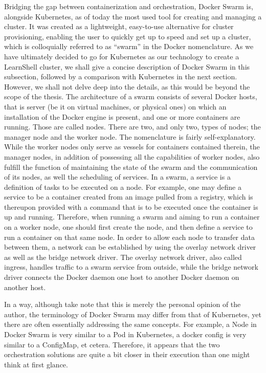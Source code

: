 \documentclass[thesis=B,english]{FITthesis}[2019/12/23]
\begin{document}
Bridging the gap between containerization and orchestration, Docker Swarm is, alongside Kubernetes, as of today the most used tool for creating and managing a cluster. It was created as a lightweight, easy-to-use alternative for cluster provisioning, enabling the user to quickly get up to speed and set up a cluster, which is colloquially referred to as “swarm” in the Docker nomenclature. As we have ultimately decided to go for Kubernetes as our technology to create a LearnShell cluster, we shall give a concise description of Docker Swarm in this subsection, followed by a comparison with Kubernetes in the next section. However, we shall not delve deep into the details, as this would be beyond the scope of the thesis.
\newline
The architecture of a swarm consists of several Docker hosts, that is server (be it on virtual machines, or physical ones) on which an installation of the Docker engine is present, and one or more containers are running. \cite{swarm-key-concepts} Those are called nodes. There are two, and only two, types of nodes; the manager node and the worker node. The nomenclature is fairly self-explanatory. While the worker nodes only serve as vessels for containers contained therein, the manager nodes, in addition of possessing all the capabilities of worker nodes, also fulfill the function of maintaining the state of the swarm and the communication of its nodes, as well the scheduling of services. In a swarm, a service is a definition of tasks to be executed on a node. \cite{swarm-nodes} For example, one may define a service to be a container created from an image pulled from a registry, which is thereupon provided with a command that is to be executed once the container is up and running. Therefore, when running a swarm and aiming to run a container on a worker node, one should first create the node, and then define a service to run a container on that same node.
\newline
In order to allow each node to transfer data between them, a network can be established by using the overlay network driver as well as the bridge network driver. The overlay network driver, also called ingress, handles traffic to a swarm service from outside, while the bridge network driver connects the Docker daemon one host to another Docker daemon on another host. 

In a way, although take note that this is merely the personal opinion of the author, the terminology of Docker Swarm may differ from that of Kubernetes, yet there are often essentially addressing the same concepts. For example, a Node in Docker Swarm is very similar to a Pod in Kubernetes, a docker config is very similar to a ConfigMap, et cetera. Therefore, it appears that the two orchestration solutions are quite a bit closer in their execution than one might think at first glance.
\end{document}
